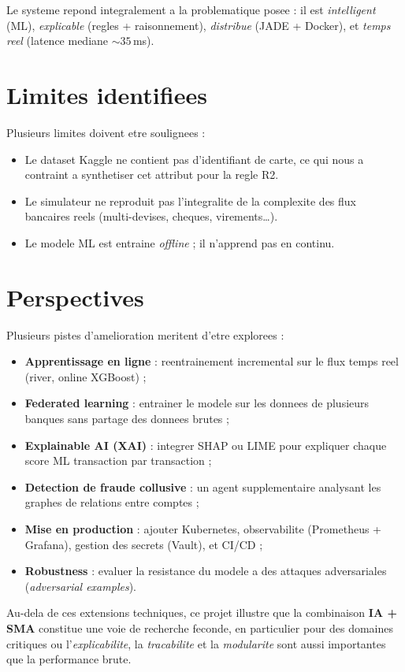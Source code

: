 \documentclass[12pt,a4paper,oneside]{report}
\begin{document}
Le systeme repond integralement a la problematique posee : il est
\emph{intelligent} (ML), \emph{explicable} (regles + raisonnement), \emph{distribue}
(JADE + Docker), et \emph{temps reel} (latence mediane $\sim 35$\,ms).

\section*{Limites identifiees}

Plusieurs limites doivent etre soulignees :

\begin{itemize}[leftmargin=*]
  \item Le dataset Kaggle ne contient pas d'identifiant de carte, ce qui nous
        a contraint a synthetiser cet attribut pour la regle R2.
  \item Le simulateur ne reproduit pas l'integralite de la complexite des
        flux bancaires reels (multi-devises, cheques, virements\dots).
  \item Le modele ML est entraine \emph{offline} ; il n'apprend pas en
        continu.
\end{itemize}

\section*{Perspectives}

Plusieurs pistes d'amelioration meritent d'etre explorees :

\begin{itemize}[leftmargin=*]
  \item \textbf{Apprentissage en ligne} : reentrainement incremental sur le
        flux temps reel (river, online XGBoost) ;
  \item \textbf{Federated learning} : entrainer le modele sur les donnees
        de plusieurs banques sans partage des donnees brutes ;
  \item \textbf{Explainable AI (XAI)} : integrer SHAP ou LIME pour expliquer
        chaque score ML transaction par transaction ;
  \item \textbf{Detection de fraude collusive} : un agent supplementaire
        analysant les graphes de relations entre comptes ;
  \item \textbf{Mise en production} : ajouter Kubernetes, observabilite
        (Prometheus + Grafana), gestion des secrets (Vault), et CI/CD ;
  \item \textbf{Robustness} : evaluer la resistance du modele a des attaques
        adversariales (\emph{adversarial examples}).
\end{itemize}

Au-dela de ces extensions techniques, ce projet illustre que la combinaison
\textbf{IA + SMA} constitue une voie de recherche feconde, en particulier
pour des domaines critiques ou l'\emph{explicabilite}, la \emph{tracabilite}
et la \emph{modularite} sont aussi importantes que la performance brute.

\nocite{*}
\printbibliography[heading=bibintoc,title={Bibliographie}]
\end{document}
